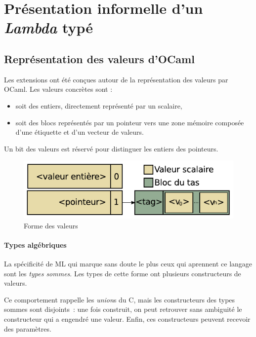 \section{Présentation informelle d'un \emph{Lambda} typé}


\subsection{Représentation des valeurs d'OCaml}

Les extensions ont été conçues autour de la représentation des valeurs par
OCaml. Les valeurs concrètes sont :
\begin{itemize}
  \item soit des entiers, directement représenté par un scalaire,
  \item soit des blocs représentés par un pointeur vers une
zone mémoire composée d'une étiquette et d'un vecteur de valeurs.
\end{itemize}
Un bit des valeurs est réservé pour distinguer les entiers des pointeurs.

\begin{figure}
\centering
\includegraphics{media/ocaml_value}
\caption{Forme des valeurs}
\end{figure}

\paragraph{Types algébriques}

La spécificité de ML qui marque sans doute le plus ceux qui aprennent ce langage
sont les \emph{types sommes}. Les types de cette forme ont plusieurs
constructeurs de valeurs.

Ce comportement rappelle les \emph{union}s du C, mais les constructeurs des
types sommes sont disjoints : une fois construit, on peut retrouver sans
ambiguité le constructeur qui a engendré une valeur. Enfin, ces constructeurs
peuvent recevoir des paramètres. 

